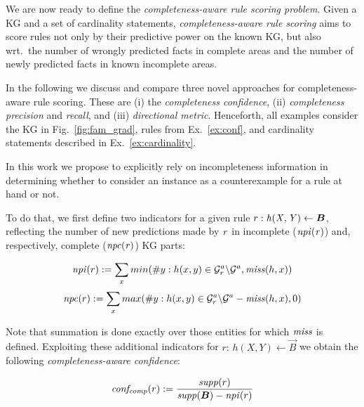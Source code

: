 We are now ready to 
define the \emph{completeness-aware rule scoring problem}.
Given a KG and a set of 
cardinality statements, \emph{completeness-aware rule scoring} aims to score rules not only by their predictive power on the known KG, but also wrt.\ the number of wrongly predicted facts  
in complete areas and the number of newly predicted 
facts in known incomplete areas.

In the following we discuss and compare  
three novel approaches for completeness-aware rule scoring. These are (i) the \emph{completeness confidence}, (ii) \emph{completeness precision} and \emph{recall}, 
and (iii) \emph{directional metric}.
Henceforth, all examples 
consider the KG in Fig.~\ref{fig:fam_grad}, 
rules from Ex.~\ref{ex:conf}, and cardinality statements  described in Ex.~\ref{ex:cardinality}.

 In this work we propose to explicitly rely on incompleteness information in determining whether to consider an instance as a counterexample for a rule at hand or not.

To do that, we first define two indicators for  a given rule $r: %
\mi{h(X,Y)}\leftarrow \vec{B}$, %
reflecting the number of new 
predictions made by $\mathit{r}$ in incomplete ($\mathit{npi(r)}$) and, respectively, complete ($\mathit{npc(r)}$) KG parts:



\begin{equation}
\mathit{npi}(r) := \sum_x min(\#y: h(x,y)\in \mathcal{G}^a_r\backslash \mathcal{G}^a, \mathit{miss}(h,x))
\end{equation}
\vspace{-\topsep}
\begin{equation}
\mathit{npc}(r) := \sum_x max(\#y: h(x,y)\in\mathcal{G}^a_r\backslash \mathcal{G}^a - \mathit{miss}(h,x), 0)
\end{equation}

Note that summation is done exactly over those entities for which $\mathit{miss}$ is defined.
Exploiting these additional indicators 
for %
$r:\,h(X,Y)\leftarrow \vec{B}$ we obtain the following \emph{completeness-aware confidence}:

\begin{equation}\label{eq:comp_conf}
\mi{conf_{comp}}(r) := \frac{\mi{supp}(r)}{\mi{supp}(\vec{B}) - \mi{npi}(r)}
\end{equation}

